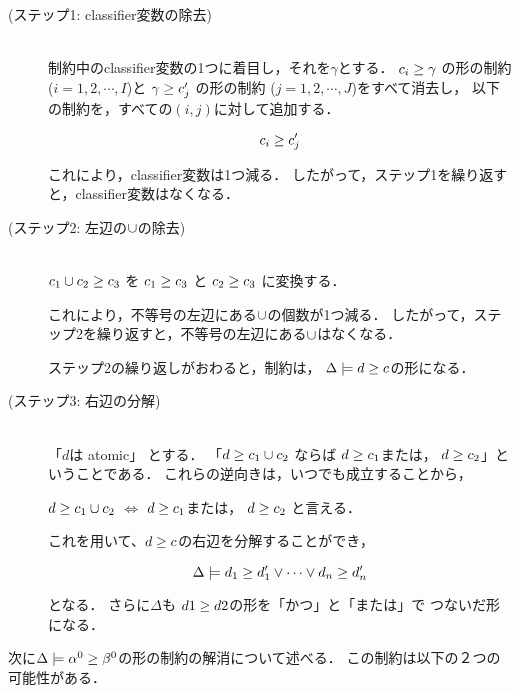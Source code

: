 \begin{description}
\item[(ステップ1: classifier変数の除去)]\mbox{}\\
  制約中のclassifier変数の1つに着目し，それを$\gamma$とする．
  ${c_i} \ge {\gamma}$ の形の制約 ($i=1,2,\cdots,I$)と
  ${\gamma} \ge {c'_j}$ の形の制約 ($j=1,2,\cdots,J$)をすべて消去し，
  以下の制約を，すべての$(i,j)$に対して追加する．

  \[
    {c_i} \ge {c'_j}
  \]

  これにより，classifier変数は1つ減る．%
  したがって，ステップ1を繰り返すと，classifier変数はなくなる．

\item[(ステップ2: 左辺の$\cup$の除去)]\mbox{}\\
  ${c_1 \cup c_2} \ge {c_3}$ を
  ${c_1} \ge {c_3}$ と
  ${c_2} \ge {c_3}$ に変換する．

  これにより，不等号の左辺にある$\cup$の個数が1つ減る．
  したがって，ステップ2を繰り返すと，不等号の左辺にある$\cup$はなくなる．

  ステップ2の繰り返しがおわると，制約は，
  $\Delta \models {d} \ge {c}$の形になる．


\item[(ステップ3: 右辺の分解)] \mbox{}\\
  「$d$は atomic」 とする．
  「${d} \ge {c_1 \cup c_2}$ ならば
  ${d} \ge {c_1}$または，
  ${d} \ge {c_2}$」ということである．
  これらの逆向きは，いつでも成立することから，

  ${d} \ge {c_1 \cup c_2}$ $\iff$
  ${d} \ge {c_1}$または，
  ${d} \ge {c_2}$
  と言える．

  これを用いて、${d} \ge {c}$の右辺を分解することができ，

  \[
    \Delta \models {d_1} \ge {d_1'} \vee \cdots \vee {d_n} \ge {d'_n}
  \]

  となる．
  さらに$\Delta$も ${d1} \ge {d2}$の形を「かつ」と「または」で
  つないだ形になる．

\end{description}

次に$\Delta \models {\alpha^0} \ge {\beta^0}$の形の制約の解消について述べる．
この制約は以下の２つの可能性がある．

